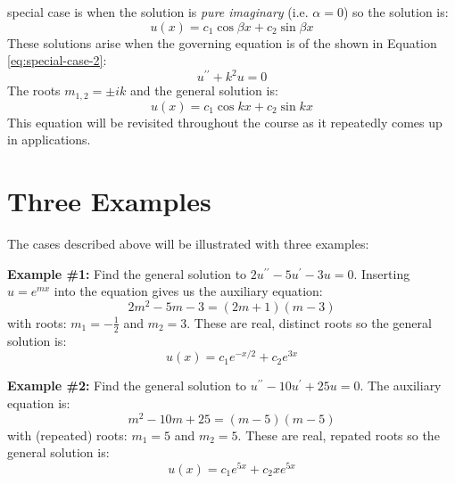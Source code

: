 \begin{enumerate}
 special case is when the solution is \emph{pure imaginary} (i.e. $\alpha = 0$) so the solution is:
\begin{equation}
u(x) = c_1 \cos{\beta x} + c_2 \sin{\beta x}
\end{equation}
These solutions arise when the governing equation is of the shown in Equation \ref{eq:special-case-2}:
\begin{equation}
u^{\prime \prime} + k^2 u = 0
\label{eq:special-case-2}
\end{equation}
The roots $m_{1,2} = \pm ik$ and the general solution is:
\begin{equation}
u(x)=c_1 \cos{kx} + c_2 \sin{kx}
\end{equation}
This equation will be revisited throughout the course as it repeatedly comes up in applications.
\end{enumerate}

\section{Three Examples}
The cases described above will be illustrated with three examples:

\vspace{0.5cm}
\noindent\textbf{Example \#1:}
Find the general solution to $2u^{\prime \prime}-5u^{\prime}-3u = 0$. Inserting $u = e^{mx}$ into the equation gives us the auxiliary equation:
\begin{equation*}
2m^2 - 5m - 3 = (2m+1)(m-3)
\end{equation*}
with roots: $m_1 = -\frac{1}{2}$ and $m_2 = 3$.  These are real, distinct roots so the general solution is:
\begin{equation*}
u(x) = c_1e^{-x/2}+c_2e^{3x}
\end{equation*}

\vspace{0.5cm}

\noindent\textbf{Example \#2:}
Find the general solution to $u^{\prime \prime}-10u^{\prime}+25u = 0$.
The auxiliary equation is:
\begin{equation*}
m^2-10m+25 = (m-5)(m-5)
\end{equation*}
with (repeated) roots: $m_1 = 5$ and $m_2 = 5$.  These are real, repated roots so the general solution is:
\begin{equation*}
u(x) = c_1e^{5x} + c_2xe^{5x}
\end{equation*}

\vspace{0.5cm}

